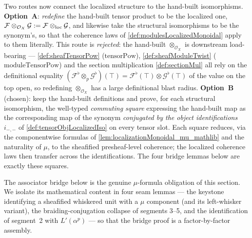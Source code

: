 Two routes now connect the localized structure to the hand-built isomorphisms.
\textbf{Option~A}: \emph{redefine} the hand-built tensor product to be the
localized one, \(\mathcal{F} \otimes_{\mathcal{O}_X} \mathcal{G} :=
\mathcal{F} \mathbin{\otimes_{\mathrm{loc}}} \mathcal{G}\), and likewise take the structural isomorphisms
to be the synonym's, so that the coherence laws of
\cref{def:modulesLocalizedMonoidal} apply to them literally. This route is
\emph{rejected}: the hand-built \(\otimes_{\mathcal{O}_X}\) is downstream
load-bearing --- \cref{def:sheafTensorPow} (\(\mathrm{tensorPow}\)),
\cref{def:sheafModuleTwist} (\(\mathrm{moduleTensorPow}\)) and the section
multiplication \cref{def:sectionMul} all rely on the definitional equality
\((\mathcal{F}^{\flat} \otimes_p \mathcal{G}^{\flat})(\top) =
\mathcal{F}^{\flat}(\top) \otimes \mathcal{G}^{\flat}(\top)\) of the value on the
top open, so redefining \(\otimes_{\mathcal{O}_X}\) has a large definitional blast
radius. \textbf{Option~B} (chosen): keep the hand-built definitions and prove,
for each structural isomorphism, the well-typed \emph{commuting square} expressing
the hand-built map as the corresponding map of the synonym \emph{conjugated by the
object identifications} \(i_{-,-}\) of \cref{def:tensorObjLocalizedIso} on every
tensor slot. Each square reduces, via the componentwise formulas of
\cref{lem:localizationMonoidal_mu_mathlib} and the naturality of \(\mu\), to the
sheafified presheaf-level coherence; the localized coherence laws then transfer
across the identifications. The four bridge lemmas below are exactly these
squares.

The associator bridge below is the genuine \(\mu\)-formula obligation of this
section. We isolate its mathematical content in four seam lemmas --- the keystone
identifying a sheafified whiskered unit with a \(\mu\) component (and its
left-whisker variant), the braiding-conjugation collapse of segments 3--5, and the
identification of segment~2 with \(L'(\alpha^p)\) --- so that the bridge proof is a
factor-by-factor assembly.

